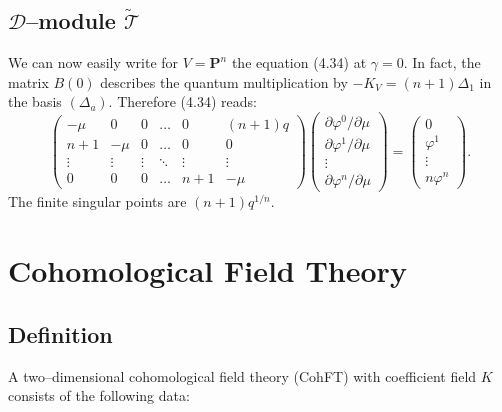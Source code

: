 \documentclass[reqno]{amsart}
\theoremstyle{definition}
\begin{document}
\medskip

\subsection{\texorpdfstring{$\mathcal{D}$--module $\widetilde{\mathcal{T}}$}
{D-module tildeT at gamma=0}}
We can now easily write for $V=\mathbf{P}^n$ the equation (4.34) at
$\gamma =0$. In fact, the matrix $B(0)$ describes the quantum
multiplication by $-K_V=(n+1)\Delta_1$ in the basis $(\Delta_a)$.
Therefore (4.34) reads:
\[
  \begin{pmatrix}
    -\mu & 0 & 0 & \dots & 0 & (n+1)q \\
    n+1 & -\mu & 0 & \dots & 0 & 0 \\
    \vdots & \vdots & \vdots & \ddots & \vdots & \vdots \\
    0 & 0 & 0 & \dots & n+1 & -\mu
  \end{pmatrix}
  \begin{pmatrix}
    \partial\varphi^0/\partial\mu\\
    \partial\varphi^1/\partial\mu\\
    \vdots\\
    \partial\varphi^n/\partial\mu
  \end{pmatrix}
  =
  \begin{pmatrix}
    0\\
    \varphi^1\\
    \vdots \\
    n\varphi^n
  \end{pmatrix}.
\]
The finite singular points are $(n+1)q^{1/n}$.

\newpage


\section{Cohomological Field Theory}

\subsection{Definition}
A two--dimensional
cohomological field theory (CohFT)
with coefficient field $K$ consists of
the following data:
\end{document}
